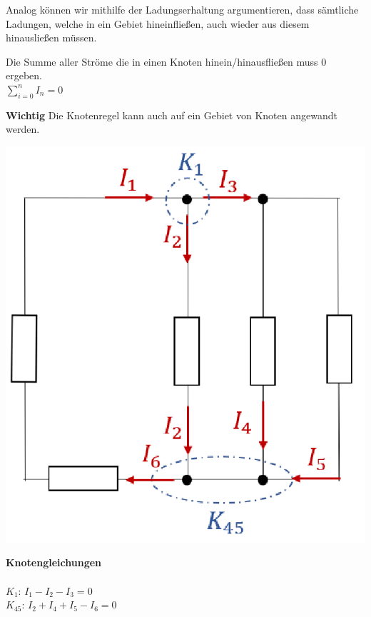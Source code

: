 										Analog können wir mithilfe der Ladungserhaltung argumentieren, dass sämtliche Ladungen, welche in ein Gebiet hineinfließen, auch wieder aus diesem hinausließen müssen.

										\beginip
										Die Summe aller Ströme die in einen Knoten hinein/hinausfließen muss $0$ ergeben. \\
										\formulaBegin
										$\displaystyle\sum_{i=0}^n I_n = 0 $
										\formulaEnd
					          \iend

										\textbf{Wichtig} Die Knotenregel kann auch auf ein Gebiet von Knoten angewandt werden. \\


										\begin{minipage}{0.6\textwidth}
										\begin{flushright}
												\includegraphics[scale=0.4]{img/knotengl.png}
											\end{flushright}
										\end{minipage}
										\begin{minipage}{0.4\textwidth}

											\textbf{Knotengleichungen} \\ \\
											$\displaystyle K_1$: $ I_1 - I_2 - I_3 = 0 $ \\
											$\displaystyle K_{45}$: $ I_2 + I_4 + I_5 - I_6 = 0 $ \\
										\end{minipage}



